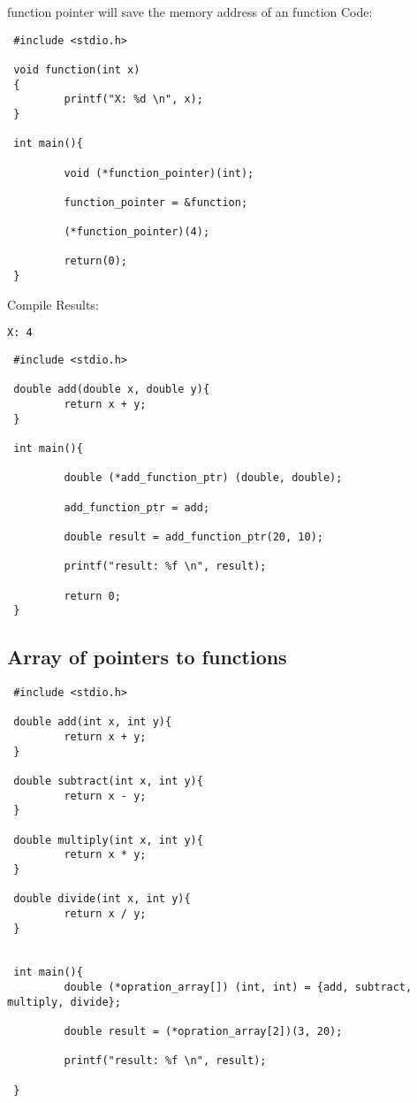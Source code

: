 function pointer will save the memory address of an function
Code:
\begin{lstlisting} 
 #include <stdio.h>

 void function(int x)
 {
         printf("X: %d \n", x);
 }

 int main(){

         void (*function_pointer)(int);

         function_pointer = &function;

         (*function_pointer)(4);

         return(0);
 }
\end{lstlisting}

Compile Results:
\begin{lstlisting} 
X: 4
\end{lstlisting}


\begin{lstlisting} 
 #include <stdio.h>

 double add(double x, double y){
         return x + y;
 }

 int main(){

         double (*add_function_ptr) (double, double);

         add_function_ptr = add;

         double result = add_function_ptr(20, 10);

         printf("result: %f \n", result);

         return 0;
 }
\end{lstlisting}

\subsection{Array of pointers to functions}

\begin{lstlisting} 
 #include <stdio.h>

 double add(int x, int y){
         return x + y;
 }

 double subtract(int x, int y){
         return x - y;
 }

 double multiply(int x, int y){
         return x * y;
 }

 double divide(int x, int y){
         return x / y;
 }


 int main(){
         double (*opration_array[]) (int, int) = {add, subtract, multiply, divide};

         double result = (*opration_array[2])(3, 20);

         printf("result: %f \n", result);

 }
\end{lstlisting}


